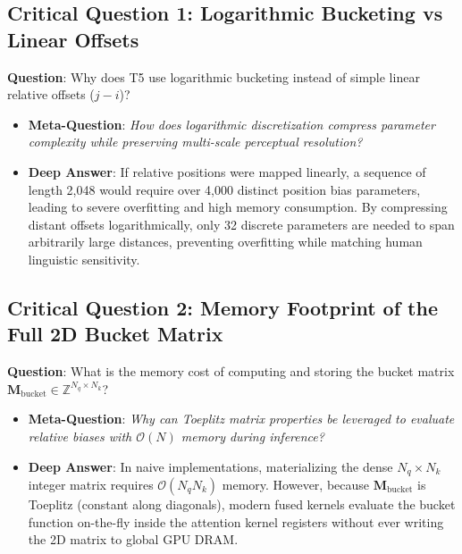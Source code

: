 \documentclass[11pt,a4paper]{article}
\theoremstyle{definition}
\begin{document}
\subsection{\textbf{Critical Question 1: Logarithmic Bucketing vs Linear Offsets}}
\textbf{Question}: Why does T5 use logarithmic bucketing instead of simple linear relative offsets ($j - i$)?
\begin{itemize}
    \item \textbf{Meta-Question}: \emph{How does logarithmic discretization compress parameter complexity while preserving multi-scale perceptual resolution?}
    \item \textbf{Deep Answer}: If relative positions were mapped linearly, a sequence of length 2,048 would require over 4,000 distinct position bias parameters, leading to severe overfitting and high memory consumption. By compressing distant offsets logarithmically, only 32 discrete parameters are needed to span arbitrarily large distances, preventing overfitting while matching human linguistic sensitivity.
\end{itemize}

\subsection{\textbf{Critical Question 2: Memory Footprint of the Full 2D Bucket Matrix}}
\textbf{Question}: What is the memory cost of computing and storing the bucket matrix $\mathbf{M}_{\text{bucket}} \in \mathbb{Z}^{N_q \times N_k}$?
\begin{itemize}
    \item \textbf{Meta-Question}: \emph{Why can Toeplitz matrix properties be leveraged to evaluate relative biases with $\mathcal{O}(N)$ memory during inference?}
    \item \textbf{Deep Answer}: In naive implementations, materializing the dense $N_q \times N_k$ integer matrix requires $\mathcal{O}(N_q N_k)$ memory. However, because $\mathbf{M}_{\text{bucket}}$ is Toeplitz (constant along diagonals), modern fused kernels evaluate the bucket function on-the-fly inside the attention kernel registers without ever writing the 2D matrix to global GPU DRAM.
\end{itemize}
\end{document}
